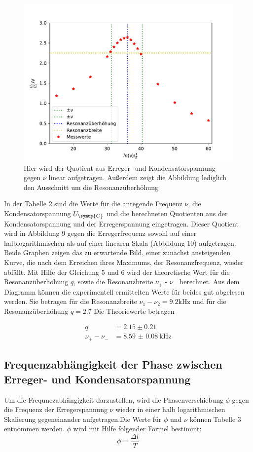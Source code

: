  \begin{figure}
  \centering
  \includegraphics[scale = 0.7]{plotC2.pdf}
  \caption{Hier wird der Quotient aus Erreger- und Kondensatorspannung gegen $\nu$ linear aufgetragen. Außerdem zeigt
  die Abbildung lediglich den Ausschnitt um die Resonanzüberhöhung}
  \label{Abb:4}
 \end{figure}

In der Tabelle 2 sind die Werte für die anregende Frequenz $\nu$, die Kondensatorspannung $U_\symup{C}$ und die berechneten
Quotienten aus der Kondensatorspannung und der Erregerspannung eingetragen. Dieser Quotient wird in Abbildung 9 gegen die
Erregerfrequenz sowohl auf einer halblogarithmischen als auf einer linearen Skala (Abbildung 10) aufgetragen.
Beide Graphen zeigen das zu erwartende Bild, einer zunächst ansteigenden Kurve, die nach dem Erreichen ihres Maximums, der
Resonanzfrequenz, wieder abfällt. Mit Hilfe der Gleichung 5 und 6 wird der theoretische Wert für die Resonanzüberhöhung
$q$, sowie die Resonanzbreite $\nu_+$ - $\nu_-$ berechnet. Aus dem Diagramm können die experimentell ermittelten Werte für beides
gut abgelesen werden.
Sie betragen für die Resonanzbreite $\nu_1 - \nu_2 = 9.2\si{\kilo\Hz}$ und für die Resonanzüberhöhung $q= 2.7$
Die Theoriewerte betragen

\begin{align*}
  q &= 2.15 \pm 0.21 \\
  \nu_+ - \nu_- &= \SI{8.59(8)}{\kilo\Hz}
\end{align*}


\subsection{Frequenzabhängigkeit der Phase zwischen Erreger- und Kondensatorspannung}
Um die Frequnezabhängigkeit darzustellen, wird die Phasenverschiebung $\phi$ gegen die Frequenz der Erregerspannung $\nu$
wieder in einer halb logarithmischen Skalierung gegeneinander aufgetragen.Die Werte für $\phi$ und $\nu$ können Tabelle 3
entnommen werden.
$\phi$ wird mit Hilfe folgender Formel bestimmt:
\begin{equation*}
  \phi = \frac{\Delta t}{T}
\end{equation*}

